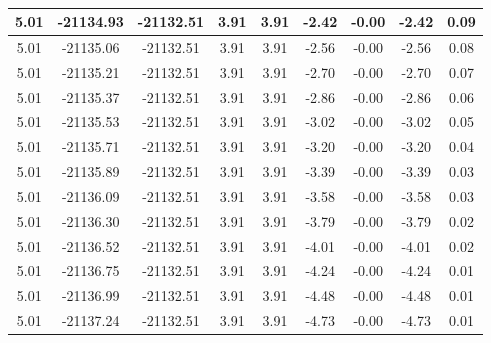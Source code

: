 \begin{table}[htbp]
\begin{adjustbox}{angle=90}
\begin{tabular}{|c|c|c|c|c|c|c|c|c|}
 5.01 & -21134.93 & -21132.51 & 3.91 & 3.91 & -2.42 & -0.00 & -2.42 & 0.09\\ \hline
 5.01 & -21135.06 & -21132.51 & 3.91 & 3.91 & -2.56 & -0.00 & -2.56 & 0.08\\ \hline
 5.01 & -21135.21 & -21132.51 & 3.91 & 3.91 & -2.70 & -0.00 & -2.70 & 0.07\\ \hline
 5.01 & -21135.37 & -21132.51 & 3.91 & 3.91 & -2.86 & -0.00 & -2.86 & 0.06\\ \hline
 5.01 & -21135.53 & -21132.51 & 3.91 & 3.91 & -3.02 & -0.00 & -3.02 & 0.05\\ \hline
 5.01 & -21135.71 & -21132.51 & 3.91 & 3.91 & -3.20 & -0.00 & -3.20 & 0.04\\ \hline
 5.01 & -21135.89 & -21132.51 & 3.91 & 3.91 & -3.39 & -0.00 & -3.39 & 0.03\\ \hline
 5.01 & -21136.09 & -21132.51 & 3.91 & 3.91 & -3.58 & -0.00 & -3.58 & 0.03\\ \hline
 5.01 & -21136.30 & -21132.51 & 3.91 & 3.91 & -3.79 & -0.00 & -3.79 & 0.02\\ \hline
 5.01 & -21136.52 & -21132.51 & 3.91 & 3.91 & -4.01 & -0.00 & -4.01 & 0.02\\ \hline
 5.01 & -21136.75 & -21132.51 & 3.91 & 3.91 & -4.24 & -0.00 & -4.24 & 0.01\\ \hline
 5.01 & -21136.99 & -21132.51 & 3.91 & 3.91 & -4.48 & -0.00 & -4.48 & 0.01\\ \hline
 5.01 & -21137.24 & -21132.51 & 3.91 & 3.91 & -4.73 & -0.00 & -4.73 & 0.01\\ \hline
            \end{tabular}
        \end{adjustbox}
        \caption{}
        \label{}
    \end{table}
    